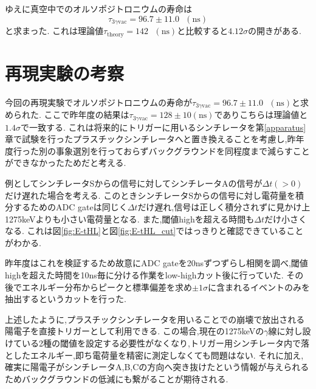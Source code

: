 ゆえに真空中でのオルソポジトロニウムの寿命は
\begin{equation}
	\nonumber
	\tau_{3\gamma\textrm{vac}}=96.7 \pm 11.0\hspace{8pt}(\textrm{ns})
\end{equation}
と求まった.
これは理論値$\tau_\textrm{theory}=142\hspace{8pt}(\textrm{ns})$と比較すると$4.12\sigma$の開きがある.

\section{再現実験の考察}
今回の再現実験でオルソポジトロニウムの寿命が$\tau_{3\gamma\textrm{vac}}=96.7 \pm 11.0\hspace{8pt}(\textrm{ns})$と求められた.
ここで昨年度の結果は$\tau_{3\gamma\textrm{vac}}=128 \pm 10(\textrm{ns})$でありこちらは理論値と$1.4\sigma$で一致する.
これは将来的にトリガーに用いるシンチレータを第\ref{apparatus}章で試験を行ったプラスチックシンチレータへと置き換えることを考慮し,昨年度行った別の事象選別を行っておらずバックグラウンドを同程度まで減らすことができなかったためだと考える.\newline

例としてシンチレータSからの信号に対してシンチレータAの信号が$\Delta t(>0)$だけ遅れた場合を考える.
このときシンチレータSからの信号に対し電荷量を積分するためのADC gateは同じく$\Delta t$だけ遅れ,信号は正しく積分されずに見かけ上1275keVよりも小さい電荷量となる.
また,閾値highを超える時間も$\Delta t$だけ小さくなる.%
これは図\ref{fig:E-tHL}と図\ref{fig:E-tHL_cut}ではっきりと確認できていることがわかる.

昨年度はこれを検証するため故意にADC gateを20nsずつずらし相関を調べ,閾値highを超えた時間を10ns毎に分ける作業をlow-highカット後に行っていた.
その後でエネルギー分布からピークと標準偏差を求め$\pm 1\sigma$に含まれるイベントのみを抽出するというカットを行った.~\cite{卒業論文2015}

上述したように,プラスチックシンチレータを用いることでの崩壊で放出される陽電子を直接トリガーとして利用できる.
この場合,現在の1275keVの$\gamma$線に対し設けている2種の閾値を設定する必要性がなくなり,トリガー用シンチレータ内で落としたエネルギー,即ち電荷量を精密に測定しなくても問題はない.
それに加え,確実に陽電子がシンチレータA,B,Cの方向へ突き抜けたという情報が与えられるためバックグラウンドの低減にも繋がることが期待される.
